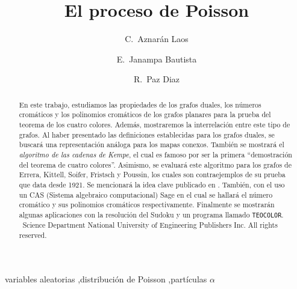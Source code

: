 \documentclass[
	3p,
	times,
	a4paper,
	authoryear
]{elsarticle}%
\begin{document}
\begin{abstract}

En este trabajo, estudiamos las propiedades de los grafos duales, los números cromáticos y los polinomios cromáticos de los grafos planares para la prueba del teorema de los cuatro colores. Además, mostraremos la interrelación entre este tipo de grafos. Al haber presentado las definiciones establecidas para los grafos duales, se buscará una representación análoga para los mapas conexos. También se mostrará el \emph{algoritmo de las cadenas de Kempe}, el cual es famoso por ser la primera ``demostración del teorema de cuatro colores''. Asimismo, se evaluará este algoritmo para los grafos de Errera, Kittell, Soifer, Fristsch y Poussin, los cuales son contraejemplos de su prueba que data desde 1921. Se mencionará la idea clave \citeauthor{birkhoff} publicado en \cite{birkhoff}. También, con el uso un CAS (Sistema algebraico computacional) Sage en el cual se hallará el número cromático y sus polinomios cromáticos respectivamente. Finalmente se mostrarán algunas aplicaciones con la resolución del Sudoku y un programa llamado \texttt{TEOCOLOR}.
\\[1mm]
\textcopyright\ Science Department National University of Engineering Publishers Inc. All rights reserved.

\end{abstract}

\begin{keyword}
variables aleatorias \sep distribución de Poisson \sep partículas $\alpha$
\end{keyword}

\begin{frontmatter}

\title{El proceso de Poisson}

\author[1,3]{C.~Aznarán Laos}


\author[1,3]{E.~Janampa Bautista}

\author[2,3]{R.~Paz Diaz}


\address[1]{Facultad de Ciencias - Escuela Profesional de Matemática}
\address[2]{Facultad de Ciencias - Escuela Profesional de Ciencia de la Computación}
\address[3]{Universidad Nacional de Ingeniería,	Av. Túpac Amaru 210, Rímac, Lima 25, Perú}

\end{frontmatter}
\end{document}
